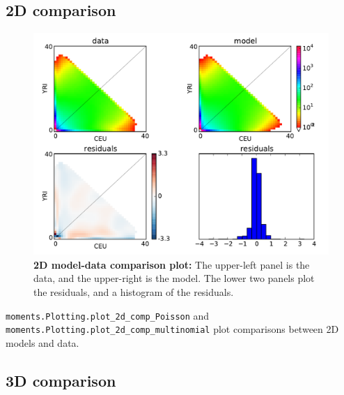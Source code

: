 \documentclass[12pt]{article}
\makeatletter
\newcommand{\py}[1]{\lstinline[breaklines=true,language=Python, showstringspaces=False]@#1@}
\makeatother
\begin{document}
\subsection{2D comparison}

\begin{figure}
\centering
\includegraphics[scale=0.5]{2d_comp}
\caption{\textbf{2D model-data comparison plot:} The upper-left panel is the data, and the upper-right is the model. The lower two panels plot the residuals, and a histogram of the residuals.\label{fig:2d_comp}}
\end{figure}

\py{moments.Plotting.plot_2d_comp_Poisson} and \py{moments.Plotting.plot_2d_comp_multinomial} plot comparisons between 2D models and data.

\subsection{3D comparison}
\end{document}
